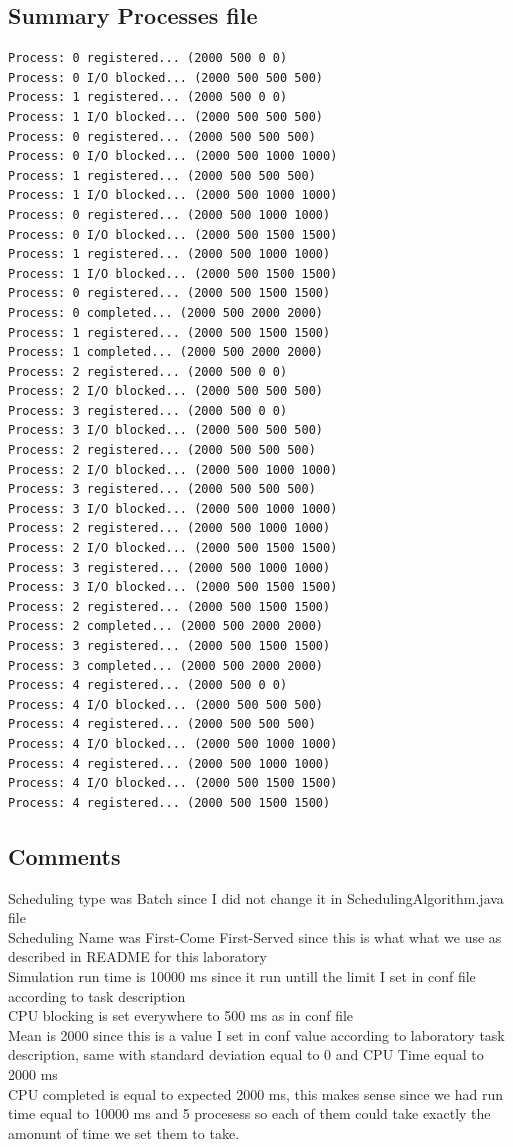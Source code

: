 \documentclass{article}
\begin{document}
\subsection{Summary Processes file}
\begin{lstlisting}
Process: 0 registered... (2000 500 0 0)
Process: 0 I/O blocked... (2000 500 500 500)
Process: 1 registered... (2000 500 0 0)
Process: 1 I/O blocked... (2000 500 500 500)
Process: 0 registered... (2000 500 500 500)
Process: 0 I/O blocked... (2000 500 1000 1000)
Process: 1 registered... (2000 500 500 500)
Process: 1 I/O blocked... (2000 500 1000 1000)
Process: 0 registered... (2000 500 1000 1000)
Process: 0 I/O blocked... (2000 500 1500 1500)
Process: 1 registered... (2000 500 1000 1000)
Process: 1 I/O blocked... (2000 500 1500 1500)
Process: 0 registered... (2000 500 1500 1500)
Process: 0 completed... (2000 500 2000 2000)
Process: 1 registered... (2000 500 1500 1500)
Process: 1 completed... (2000 500 2000 2000)
Process: 2 registered... (2000 500 0 0)
Process: 2 I/O blocked... (2000 500 500 500)
Process: 3 registered... (2000 500 0 0)
Process: 3 I/O blocked... (2000 500 500 500)
Process: 2 registered... (2000 500 500 500)
Process: 2 I/O blocked... (2000 500 1000 1000)
Process: 3 registered... (2000 500 500 500)
Process: 3 I/O blocked... (2000 500 1000 1000)
Process: 2 registered... (2000 500 1000 1000)
Process: 2 I/O blocked... (2000 500 1500 1500)
Process: 3 registered... (2000 500 1000 1000)
Process: 3 I/O blocked... (2000 500 1500 1500)
Process: 2 registered... (2000 500 1500 1500)
Process: 2 completed... (2000 500 2000 2000)
Process: 3 registered... (2000 500 1500 1500)
Process: 3 completed... (2000 500 2000 2000)
Process: 4 registered... (2000 500 0 0)
Process: 4 I/O blocked... (2000 500 500 500)
Process: 4 registered... (2000 500 500 500)
Process: 4 I/O blocked... (2000 500 1000 1000)
Process: 4 registered... (2000 500 1000 1000)
Process: 4 I/O blocked... (2000 500 1500 1500)
Process: 4 registered... (2000 500 1500 1500)
\end{lstlisting}    
\subsection{Comments}
Scheduling type was Batch since I did not change it in SchedulingAlgorithm.java
file \\
Scheduling Name was First-Come First-Served since this is what what we use as
described in README for this laboratory \\
Simulation run time is 10000 ms since it run untill the limit I set in conf file
according to task description \\
CPU blocking is set everywhere to 500 ms as in conf file \\
Mean is 2000 since this is a value I set in conf value according to laboratory
task description, same with standard deviation equal to 0 and CPU Time equal to
2000 ms \\
CPU completed is equal to expected 2000 ms, this makes sense since we had run
time equal to 10000 ms and 5 procesess so each of them could take exactly the
amonunt of time we set them to take.
\end{document}
